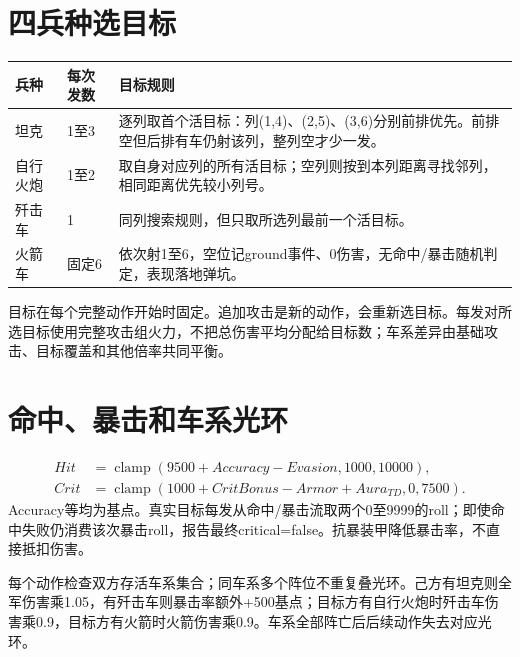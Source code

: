 \section{四兵种选目标}
\begin{center}\end{center}
\begin{small}\begin{longtable}{@{}P{22mm}P{23mm}P{99mm}@{}}
\toprule 兵种 & 每次发数 & 目标规则\\\midrule\endhead
坦克 & 1至3 & 逐列取首个活目标：列(1,4)、(2,5)、(3,6)分别前排优先。前排空但后排有车仍射该列，整列空才少一发。\\
自行火炮 & 1至2 & 取自身对应列的所有活目标；空列则按到本列距离寻找邻列，相同距离优先较小列号。\\
歼击车 & 1 & 同列搜索规则，但只取所选列最前一个活目标。\\
火箭车 & 固定6 & 依次射1至6，空位记ground事件、0伤害，无命中/暴击随机判定，表现落地弹坑。\\
\bottomrule\end{longtable}\end{small}
目标在每个完整动作开始时固定。追加攻击是新的动作，会重新选目标。每发对所选目标使用完整攻击组火力，不把总伤害平均分配给目标数；车系差异由基础攻击、目标覆盖和其他倍率共同平衡。

\section{命中、暴击和车系光环}
\begin{align}
Hit&=\operatorname{clamp}(9500+Accuracy-Evasion,1000,10000),\\
Crit&=\operatorname{clamp}(1000+CritBonus-Armor+Aura_{TD},0,7500).
\end{align}
Accuracy等均为基点。真实目标每发从命中/暴击流取两个0至9999的roll；即使命中失败仍消费该次暴击roll，报告最终critical=false。抗暴装甲降低暴击率，不直接抵扣伤害。

每个动作检查双方存活车系集合；同车系多个阵位不重复叠光环。己方有坦克则全军伤害乘1.05，有歼击车则暴击率额外+500基点；目标方有自行火炮时歼击车伤害乘0.9，目标方有火箭时火箭伤害乘0.9。车系全部阵亡后后续动作失去对应光环。

